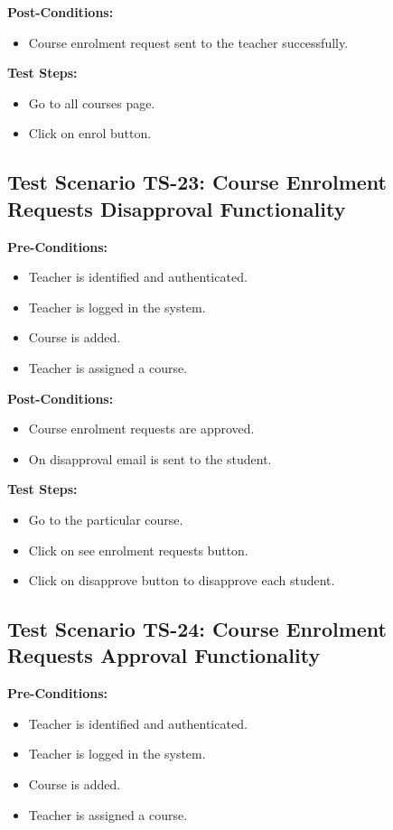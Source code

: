 \textbf{Post-Conditions: }
\begin{itemize}
\item Course enrolment request sent to the teacher successfully.

\end{itemize}
\textbf{Test Steps:}
\begin{itemize}

\item Go to all courses page.
\item Click on enrol button.

\end{itemize}



\subsection{Test Scenario TS-23: Course Enrolment Requests Disapproval Functionality}
\textbf{Pre-Conditions: }
\begin{itemize}

\item Teacher is identified and authenticated.
\item Teacher is logged in the system.
\item Course is added.
\item Teacher is assigned a course.

\end{itemize}

\textbf{Post-Conditions: }
\begin{itemize}
\item Course enrolment requests are approved.
\item On disapproval email is sent to the student.

\end{itemize}
\textbf{Test Steps:}
\begin{itemize}

\item Go to the particular course.
\item Click on see enrolment requests button.
\item Click on disapprove button to disapprove each student.

\end{itemize}



\subsection{Test Scenario TS-24: Course Enrolment Requests Approval Functionality}
\textbf{Pre-Conditions: }
\begin{itemize}

\item Teacher is identified and authenticated.
\item Teacher is logged in the system.
\item Course is added.
\item Teacher is assigned a course.

\end{itemize}

